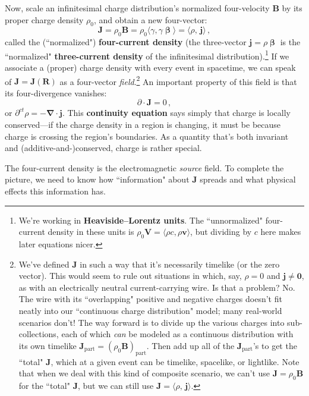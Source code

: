 \documentclass[12pt]{article}
\renewcommand{\vv}[1]{\mathbf{#1}}
\newcommand{\vvbeta}{\bm{\upbeta}}
\newcommand{\del}{\boldsymbol{\nabla}}
\begin{document}
Now, scale an infinitesimal charge distribution's normalized four-velocity $\vv B$ by its proper charge density $\rho_0$, and obtain a new four-vector:
\begin{equation}\label{eq:fc}
\boxed{ \vv J = \rho_0 \vv B = \rho_0 \langle \gamma , \gamma \vvbeta \rangle = \langle \rho, \, \vv j \rangle } \, ,
\end{equation}
called the (``normalized") \textbf{four-current density} (the three-vector $\vv j = \rho \vvbeta$ is the ``normalized" \textbf{three-current density} of the infinitesimal distribution).\footnote{We're working in \textbf{Heaviside--Lorentz units}. The ``unnormalized" four-current density in these units is $\rho_0 \vv V = \langle \rho c, \rho \vv v \rangle$, but dividing by $c$ here makes later equations nicer.} If we associate a (proper) charge density with every event in spacetime, we can speak of $\vv J = \vv J (\vv R)$ as a four-vector \emph{field}.\footnote{\label{fn:jpart}We've defined $\vv J$ in such a way that it's necessarily timelike (or the zero vector). This would seem to rule out situations in which, say, $\rho = 0$ and $\vv j \neq \vv 0$, as with an electrically neutral current-carrying wire. Is that a problem? No. The wire with its ``overlapping" positive and negative charges doesn't fit neatly into our ``continuous charge distribution" model; many real-world scenarios don't! The way forward is to divide up the various charges into sub-collections, each of which \emph{can} be modeled as a continuous distribution with its own timelike $\vv J_{\textrm{part}} = ( \rho_0 \vv B )_{\textrm{part}}$. Then add up all of the $\vv J_{\textrm{part}}$'s to get the ``total" $\vv J$, which at a given event can be timelike, spacelike, or lightlike. Note that when we deal with this kind of composite scenario, we can't use $\vv J = \rho_0 \vv B$ for the ``total" $\vv J$, but we can still use $\vv J = \langle \rho, \, \vv j \rangle $.} An important property of this field is that its four-divergence vanishes:
\begin{equation}\label{eq:con}
\boxed{\partialup \cdot \vv J = 0} \, ,
\end{equation}
or $\partial^{ct} \rho = - \del \cdot \vv j$. This \textbf{continuity equation} says simply that charge is locally conserved---if the charge density in a region is changing, it must be because charge is crossing the region's boundaries. As a quantity that's both invariant and (additive-and-)conserved, charge is rather special.

The four-current density is the electromagnetic \emph{source} field. To complete the picture, we need to know how ``information" about $\vv J$ spreads and what physical effects this information has.
\end{document}
